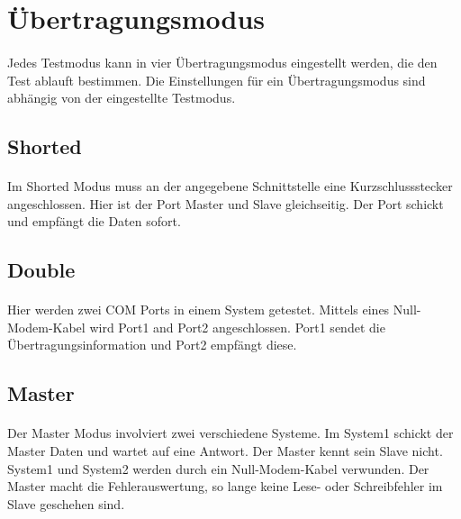 \paragraph{}


\section{Übertragungsmodus}
\paragraph{}
Jedes Testmodus kann in vier Übertragungsmodus eingestellt werden, die den Test ablauft bestimmen. Die Einstellungen für ein Übertragungsmodus sind abhängig von der eingestellte Testmodus.


\subsection{Shorted}
\paragraph{}
Im Shorted Modus muss an der angegebene Schnittstelle eine Kurzschlussstecker angeschlossen. Hier ist der Port Master und Slave gleichseitig. Der Port schickt und empfängt die Daten sofort.


\subsection{Double}
\paragraph{}
Hier werden zwei COM Ports in einem System getestet. Mittels eines Null-Modem-Kabel wird Port1 and Port2 angeschlossen. Port1 sendet die Übertragungsinformation und Port2 empfängt diese.


\subsection{Master}
\paragraph{}
Der Master Modus involviert zwei verschiedene Systeme. Im System1 schickt der Master Daten und wartet auf eine Antwort. Der Master kennt sein Slave nicht. System1 und System2 werden durch ein Null-Modem-Kabel verwunden. Der Master macht die Fehlerauswertung, so lange keine Lese- oder Schreibfehler im Slave geschehen sind.


